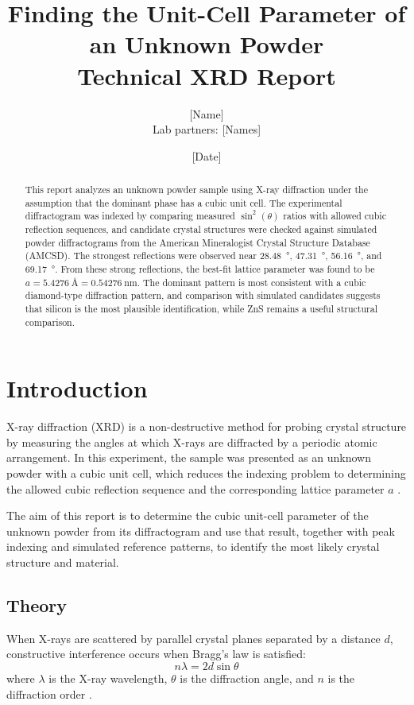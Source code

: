 \documentclass[11pt,a4paper]{article}
\title{Finding the Unit-Cell Parameter of an Unknown Powder\\[0.4em]\large Technical XRD Report}
\author{[Name]\\Lab partners: [Names]}
\date{[Date]}
\begin{document}
\maketitle
\begin{abstract}
This report analyzes an unknown powder sample using X-ray diffraction under the assumption that the dominant phase has a cubic unit cell. The experimental diffractogram was indexed by comparing measured $\sin^2(\theta)$ ratios with allowed cubic reflection sequences, and candidate crystal structures were checked against simulated powder diffractograms from the American Mineralogist Crystal Structure Database (AMCSD). The strongest reflections were observed near \SI{28.48}{\degree}, \SI{47.31}{\degree}, \SI{56.16}{\degree}, and \SI{69.17}{\degree}. From these strong reflections, the best-fit lattice parameter was found to be $a = \SI{5.4276}{\angstrom} = \SI{0.54276}{\nano\meter}$. The dominant pattern is most consistent with a cubic diamond-type diffraction pattern, and comparison with simulated candidates suggests that silicon is the most plausible identification, while ZnS remains a useful structural comparison.
\end{abstract}

\section{Introduction}
X-ray diffraction (XRD) is a non-destructive method for probing crystal structure by measuring the angles at which X-rays are diffracted by a periodic atomic arrangement. In this experiment, the sample was presented as an unknown powder with a cubic unit cell, which reduces the indexing problem to determining the allowed cubic reflection sequence and the corresponding lattice parameter $a$ \citep{onnink2026}.

The aim of this report is to determine the cubic unit-cell parameter of the unknown powder from its diffractogram and use that result, together with peak indexing and simulated reference patterns, to identify the most likely crystal structure and material.

\subsection{Theory}
When X-rays are scattered by parallel crystal planes separated by a distance $d$, constructive interference occurs when Bragg's law is satisfied:
\begin{equation}
  n \lambda = 2 d \sin\theta
\end{equation}
where $\lambda$ is the X-ray wavelength, $\theta$ is the diffraction angle, and $n$ is the diffraction order \citep{bragg1913}.
\end{document}
